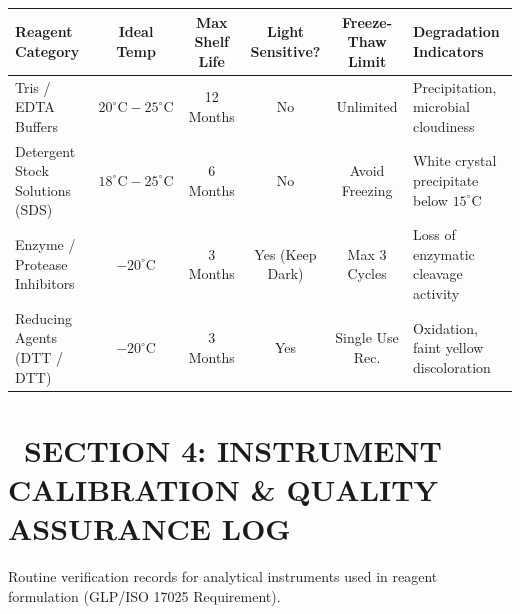 \documentclass[10pt,a4paper]{article}
\begin{document}
\begin{tcolorbox}[labcard, title={\small\bfseries\color{labnavy}\faThermometerHalf\ REAGENT STABILITY \& STORAGE MATRIX}, colback=white]
  \scriptsize
  \begin{tabularx}{\textwidth}{@{}XccccX@{}}
    \toprule
    \rowcolor{labnavy!10}
    \textbf{Reagent Category} & \textbf{Ideal Temp} & \textbf{Max Shelf Life} & \textbf{Light Sensitive?} & \textbf{Freeze-Thaw Limit} & \textbf{Degradation Indicators} \\
    \midrule
    Tris / EDTA Buffers & $20^\circ\text{C} - 25^\circ\text{C}$ & 12 Months & No & Unlimited & Precipitation, microbial cloudiness \\
    Detergent Stock Solutions (SDS) & $18^\circ\text{C} - 25^\circ\text{C}$ & 6 Months & No & Avoid Freezing & White crystal precipitate below $15^\circ\text{C}$ \\
    Enzyme / Protease Inhibitors & $-20^\circ\text{C}$ & 3 Months & Yes (Keep Dark) & Max 3 Cycles & Loss of enzymatic cleavage activity \\
    Reducing Agents (DTT / DTT) & $-20^\circ\text{C}$ & 3 Months & Yes & Single Use Rec. & Oxidation, faint yellow discoloration \\
    \bottomrule
  \end{tabularx}
\end{tcolorbox}

\newpage


{\section*{{\Large\bfseries\color{labnavy}\faTools\ SECTION 4: INSTRUMENT CALIBRATION \& QUALITY ASSURANCE LOG}}}
\vspace{-6pt}
{\small\color{labtext}Routine verification records for analytical instruments used in reagent formulation (GLP/ISO 17025 Requirement).}

\vspace{4pt}
\end{document}
